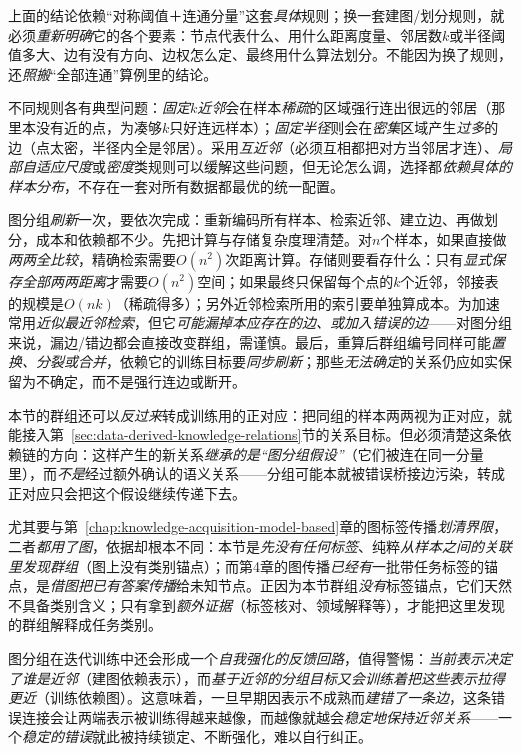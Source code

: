 上面的结论依赖“对称阈值＋连通分量”这套\emph{具体}规则；换一套建图/划分规则，就必须\emph{重新明确}它的各个要素：节点代表什么、用什么距离度量、邻居数$k$或半径阈值多大、边有没有方向、边权怎么定、最终用什么算法划分。不能因为换了规则，还\emph{照搬}“全部连通”算例里的结论。

不同规则各有典型问题：\emph{固定$k$近邻}会在样本\emph{稀疏}的区域强行连出很远的邻居（那里本没有近的点，为凑够$k$只好连远样本）；\emph{固定半径}则会在\emph{密集}区域产生\emph{过多}的边（点太密，半径内全是邻居）。采用\emph{互近邻}（必须互相都把对方当邻居才连）、\emph{局部自适应尺度}或\emph{密度}类规则可以缓解这些问题，但无论怎么调，选择都\emph{依赖具体的样本分布}，不存在一套对所有数据都最优的统一配置。

图分组\emph{刷新}一次，要依次完成：重新编码所有样本、检索近邻、建立边、再做划分，成本和依赖都不少。先把计算与存储复杂度理清楚。对$n$个样本，如果直接做\emph{两两全比较}，精确检索需要$O(n^2)$次距离计算。存储则要看存什么：只有\emph{显式保存全部两两距离}才需要$O(n^2)$空间；如果最终只保留每个点的$k$个近邻，邻接表的规模是$O(nk)$（稀疏得多）；另外近邻检索所用的索引要单独算成本。为加速常用\emph{近似最近邻检索}，但它\emph{可能漏掉本应存在的边、或加入错误的边}——对图分组来说，漏边/错边都会直接改变群组，需谨慎。最后，重算后群组编号同样可能\emph{置换、分裂或合并}，依赖它的训练目标要\emph{同步刷新}；那些\emph{无法确定}的关系仍应如实保留为不确定，而不是强行连边或断开。

本节的群组还可以\emph{反过来}转成训练用的正对应：把同组的样本两两视为正对应，就能接入第~\ref{sec:data-derived-knowledge-relations}节的关系目标。但必须清楚这条依赖链的方向：这样产生的新关系\emph{继承的是“图分组假设”}（它们被连在同一分量里），而\emph{不是}经过额外确认的语义关系——分组可能本就被错误桥接边污染，转成正对应只会把这个假设继续传递下去。

尤其要与第~\ref{chap:knowledge-acquisition-model-based}章的图标签传播\emph{划清界限}，二者\emph{都用了图}，依据却根本不同：本节是\emph{先没有任何标签}、纯粹\emph{从样本之间的关联里发现群组}（图上没有类别锚点）；而第4章的图传播\emph{已经有}一批带任务标签的锚点，是\emph{借图把已有答案传播}给未知节点。正因为本节群组\emph{没有}标签锚点，它们天然不具备类别含义；只有拿到\emph{额外证据}（标签核对、领域解释等），才能把这里发现的群组解释成任务类别。

图分组在迭代训练中还会形成一个\emph{自我强化的反馈回路}，值得警惕：\emph{当前表示决定了谁是近邻}（建图依赖表示），而\emph{基于近邻的分组目标又会训练着把这些表示拉得更近}（训练依赖图）。这意味着，一旦早期因表示不成熟而\emph{建错了一条边}，这条错误连接会让两端表示被训练得越来越像，而越像就越会\emph{稳定地保持近邻关系}——一个\emph{稳定的错误}就此被持续锁定、不断强化，难以自行纠正。

